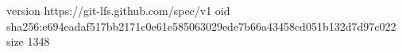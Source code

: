 version https://git-lfs.github.com/spec/v1
oid sha256:e694eadaf517bb2171c0e61e585063029ede7b66a43458cd051b132d7d97c022
size 1348
